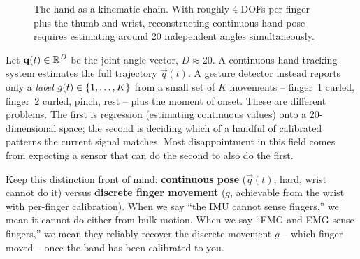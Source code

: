 \begin{figure}[htbp]
\centering
{}
\caption{The hand as a kinematic chain. With roughly 4 DOFs per finger plus the thumb and wrist, reconstructing continuous hand pose requires estimating around 20 independent angles simultaneously.}
\label{ch37:fig-hand-dof}
\end{figure}

\begin{formalbox}
Let $\mathbf{q}(t)\in\mathbb{R}^{D}$ be the joint-angle vector, $D\approx 20$. A continuous
hand-tracking system estimates the full trajectory $\vec{q}(t)$. A gesture
detector instead reports only a \emph{label} $g(t)\in\{1,\dots,K\}$ from a
small set of $K$ movements -- finger~1 curled, finger~2 curled, pinch, rest -- plus
the moment of onset. These are different problems. The first is regression (estimating continuous values) onto a
$20$-dimensional space; the second is deciding which of a handful of calibrated
patterns the current signal matches. Most disappointment in this field comes from
expecting a sensor that can do the second to also do the first.
\end{formalbox}

Keep this distinction front of mind: \textbf{continuous pose} ($\vec{q}(t)$, hard,
wrist cannot do it) versus \textbf{discrete finger movement} ($g$, achievable from
the wrist with per-finger calibration). When we say ``the IMU cannot sense fingers,''
we mean it cannot do either from bulk motion. When we say ``FMG and EMG sense
fingers,'' we mean they reliably recover the discrete movement $g$ -- which finger
moved -- once the band has been calibrated to you.

